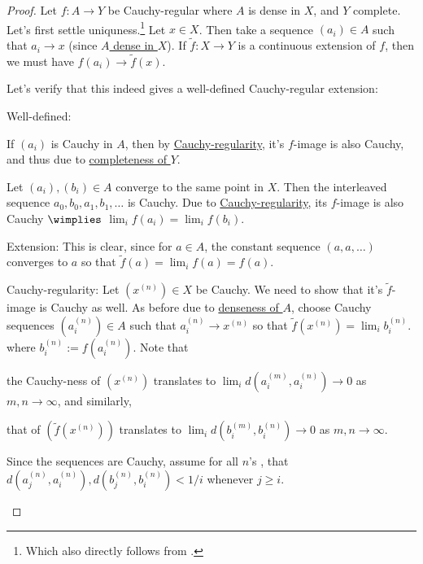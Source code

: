 	\begin{proof}
		Let $f\colon A\to Y$ be Cauchy-regular where $A$ is dense in $X$, and $Y$ complete. Let's first settle uniquness.\footnote{Which also directly follows from .} Let $x\in X$. Then take a sequence $(a_i)\in A$ such that $a_i\to x$ (since \uline{$A$ dense in $X$}). If $\tilde f\colon X\to Y$ is a continuous extension of $f$, then we must have $f(a_i)\to \tilde f(x)$.
		
		Let's verify that this indeed gives a well-defined Cauchy-regular extension:
		\begin{prooflist}
			\item Well-defined:
			\begin{mylist}
				\item If $(a_i)$ is Cauchy in $A$, then by \uline{Cauchy-regularity}, it's $f$-image is also Cauchy, and thus \cgt due to \uline{completeness of $Y$}.
				
				\item Let $(a_i), (b_i)\in A$ converge to the same point in $X$. Then the interleaved sequence $a_0, b_0, a_1, b_1, \ldots$ is Cauchy. Due to \uline{Cauchy-regularity}, its $f$-image is also Cauchy $\wimplies$ $\lim_i f(a_i) = \lim_i f(b_i)$.
			\end{mylist}
			
			
			
			\item Extension:
			This is clear, since for $a\in A$, the constant sequence $(a, a, \ldots)$ converges to $a$ so that $\tilde f(a) = \lim_i f(a) = f(a)$.
			
			
			
			\item Cauchy-regularity:
			Let $(x^{(n)})\in X$ be Cauchy. We need to show that it's $\tilde f$-image is Cauchy as well. As before due to \uline{denseness of $A$}, choose Cauchy sequences $( a^{(n)}_i )\in A$ such that $a^{(n)}_i\to x^{(n)}$ so that $\tilde f(x^{(n)}) = \lim_i b^{(n)}_i$. where $b^{(n)}_i := f(a^{(n)}_i)$. Note that
			\begin{mylist}
				\item the Cauchy-ness of $(x^{(n)})$ translates to $\lim_i d(a^{(m)}_i, a^{(n)}_i)\to 0$ as $m, n\to\infty$, and similarly,
				
				\item that of $(\tilde f(x^{(n)}))$ translates to $\lim_i d(b^{(m)}_i, b^{(n)}_i)\to 0$ as $m, n\to\infty$.
			\end{mylist}
			Since the sequences are Cauchy, assume for all $n$'s \wlogg, that $d(a^{(n)}_j, a^{(n)}_i), d(b^{(n)}_j, b^{(n)}_i) < 1/i$ whenever $j\ge i$.
			

\end{prooflist}
\end{proof}
